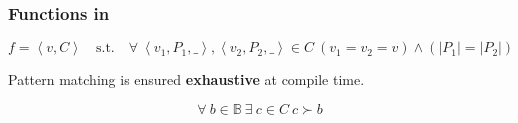 \begin{frame}

\frametitle{Functions in \D{}}

$$f = \left\langle v, C \right\rangle \quad \text{s.t.} \quad \forall\
\left\langle v_1,P_1,\_ \right\rangle, \left\langle v_2,P_2,\_ \right\rangle
\in C\ \left( v_1=v_2=v \right) \wedge \left( \left|P_1\right| =
\left|P_2\right| \right)$$


\begin{center}

\item Pattern matching is ensured {\bf exhaustive} at compile time.

\end{center}

$$\forall\ b \in \mathbb{B}\ \exists\ c \in C\ c\succ b$$

\end{frame}
